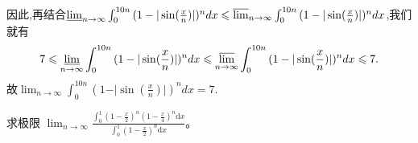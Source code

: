 \documentclass[../../main.tex]{subfiles}
\begin{document}
\begin{solution}
因此,再结合\(\varliminf_{n\rightarrow\infty}\int_0^{10n}{(1-\vert\sin(\frac{x}{n})\vert)^n}dx\leqslant\varlimsup_{n\rightarrow\infty}\int_0^{10n}{(1-\vert\sin(\frac{x}{n})\vert)^n}dx\),我们就有
\[
7\leqslant\varliminf_{n\rightarrow\infty}\int_0^{10n}{(1-\vert\sin(\frac{x}{n})\vert)^n}dx\leqslant\varlimsup_{n\rightarrow\infty}\int_0^{10n}{(1-\vert\sin(\frac{x}{n})\vert)^n}dx\leqslant 7.
\]
故\(\lim_{n\rightarrow\infty}\int_0^{10n}{(1-\vert\sin(\frac{x}{n})\vert)^n}dx = 7\).
\end{solution}

\begin{example}
求极限 $\lim_{n\rightarrow \infty} \frac{\int_0^1{\left( 1-\frac{x}{2} \right) ^n\left( 1-\frac{x}{4} \right) ^n\mathrm{d}x}}{\int_0^1{\left( 1-\frac{x}{2} \right) ^n\mathrm{d}x}}$。
\end{example}
\end{document}
